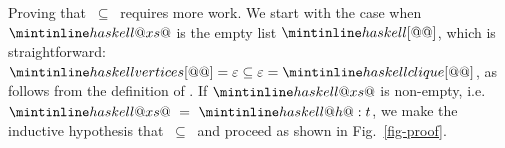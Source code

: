 Proving that  $\ \subseteq\ $  requires more work.
We start with the case when $\hs{@\blk{xs}@}$ is the empty list $\hs{[@@]}$,
which is straightforward:
$\hs{vertices [@@]} = \varepsilon \subseteq \varepsilon = \hs{clique [@@]}$,
as follows from the definition of .
If $\hs{@\blk{xs}@}$ is non-empty, i.e. $\hs{@\blk{xs}@}\ =\ \hs{@\blk{h}@:t}$,
we make the inductive hypothesis that
 $\ \subseteq\ $  and proceed as shown in Fig.~\ref{fig-proof}.






